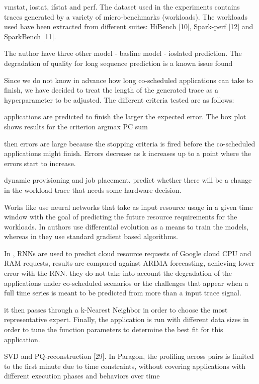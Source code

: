 \documentclass[UTF8]{article}
\begin{document}
vmstat, iostat, ifstat and perf. The dataset used in the experiments contains traces generated by a variety of micro-benchmarks (workloads). The workloads used have been extracted from different suites: HiBench [10], Spark-perf [12] and SparkBench [11]. 

The author have three other model - basline model - ioslated prediction. The degradation of quality for long sequence prediction is a known issue found

Since we do not know in advance how long co-scheduled applications can take to finish, we have decided to treat the length of the generated trace as a hyperparameter to be adjusted. The different criteria tested are as follows:

applications are predicted to finish the larger the expected error. The box plot shows results for the criterion argmax PC sum

then errors are large because the stopping criteria is fired before the co-scheduled applications might finish. Errors decrease as k increases up to a point where the errors start to increase.

dynamic provisioning and job placement. predict whether there will be a change in the workload trace that needs some hardware decision. 

Works like \cite{islam2012empirical, kumar2018workload} use neural networks that take as input resource usage in a given time window with the goal of predicting the future resource requirements for the workloads. In authors use differential evolution as a means to train the models, whereas in they use standard gradient based algorithms.

In \cite{zhang2016workload}, RNNs are used to predict cloud resource requests of Google cloud CPU and RAM requests, results are compared against ARIMA forecasting, achieving lower error with the RNN. they do not take into account the degradation of the applications under co-scheduled scenarios or the challenges that appear when a full time series is meant to be predicted from more than a input trace signal.

\cite{marco2017improving} it then passes through a k-Nearest Neighbor in order to choose the most representative expert. Finally, the application is run with different data sizes in order to tune the function parameters to determine the best fit for this application. 

SVD and PQ-reconstruction [29]. In Paragon, the profiling across pairs is limited to the first minute due to time constraints, without covering applications with different execution phases and behaviors over time
\end{document}
